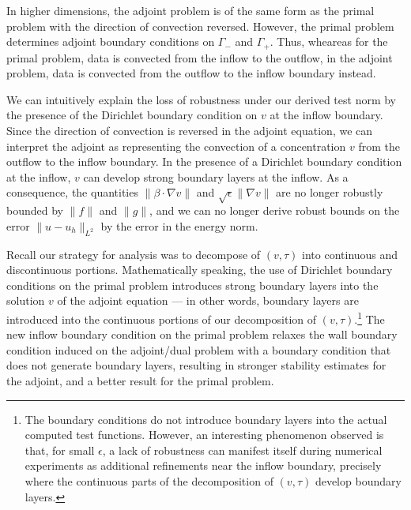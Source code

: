 \documentclass[11pt,onecolumn]{scrartcl}
\newcommand{\grad}{\nabla}
\begin{document}
In higher dimensions, the adjoint problem is of the same form as the primal problem with the direction of convection reversed. However, the primal problem determines adjoint boundary conditions on $\Gamma_-$ and $\Gamma_+$. Thus, wheareas for the primal problem, data is convected from the inflow to the outflow, in the adjoint problem, data is convected from the outflow to the inflow boundary instead. 

We can intuitively explain the loss of robustness under our derived test norm by the presence of the Dirichlet boundary condition on $v$ at the inflow boundary. Since the direction of convection is reversed in the adjoint equation, we can interpret the adjoint as representing the convection of a concentration $v$ from the outflow to the inflow boundary. In the presence of a Dirichlet boundary condition at the inflow, $v$ can develop strong boundary layers at the inflow. As a consequence, the quantities $\|\beta\cdot \grad v\|$ and $\sqrt{\epsilon}\|\grad v\|$ are no longer robustly bounded by $\|f\|$ and $\|g\|$, and we can no longer derive robust bounds on the error $\|u-u_h\|_{L^2}$ by the error in the energy norm.

Recall our strategy for analysis was to decompose of $(v,\tau)$ into continuous and discontinuous portions. Mathematically speaking, the use of Dirichlet boundary conditions on the primal problem introduces strong boundary layers into the solution $v$ of the adjoint equation --- in other words, boundary layers are introduced into the continuous portions of our decomposition of $(v,\tau)$.\footnote{The boundary conditions do not introduce boundary layers into the actual computed test functions. However, an interesting phenomenon observed is that, for small $\epsilon$, a lack of robustness can manifest itself during numerical experiments as additional refinements near the inflow boundary, precisely where the continuous parts of the decomposition of $(v,\tau)$ develop boundary layers.} The new inflow boundary condition on the primal problem relaxes the wall boundary condition induced on the adjoint/dual problem with a boundary condition that does not generate boundary layers, resulting in stronger stability estimates for the adjoint, and a better result for the primal problem. 

\end{document}
